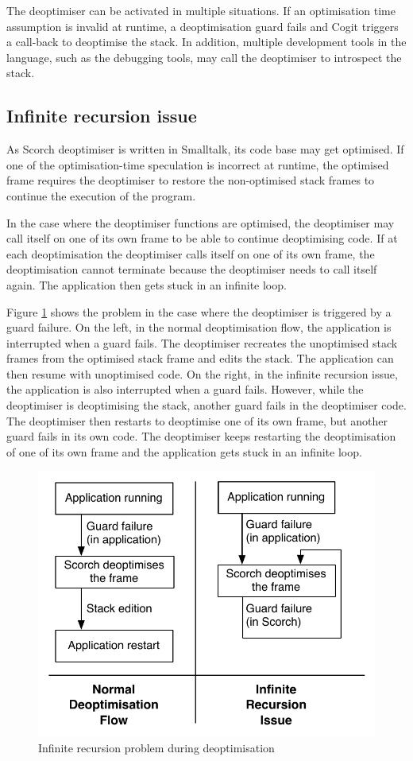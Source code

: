 \documentclass[a4paper,12pt,twoside]{../includes/ThesisStyle}
\begin{document}
The deoptimiser can be activated in multiple situations. If an optimisation time assumption is invalid at runtime, a deoptimisation guard fails and Cogit triggers a call-back to deoptimise the stack. In addition, multiple development tools in the language, such as the debugging tools, may call the deoptimiser to introspect the stack.

\subsection{Infinite recursion issue}

As Scorch deoptimiser is written in Smalltalk, its code base may get optimised. If one of the optimisation-time speculation is incorrect at runtime, the optimised frame requires the deoptimiser to restore the non-optimised stack frames to continue the execution of the program. 

In the case where the deoptimiser functions are optimised, the deoptimiser may call itself on one of its own frame to be able to continue deoptimising code. If at each deoptimisation the deoptimiser calls itself on one of its own frame, the deoptimisation cannot terminate because the deoptimiser needs to call itself again. The application then gets stuck in an infinite loop.

Figure \ref{fig:InfiniteRecursionDeoptPb} shows the problem in the case where the deoptimiser is triggered by a guard failure. On the left, in the normal deoptimisation flow, the application is interrupted when a guard fails. The deoptimiser recreates the unoptimised stack frames from the optimised stack frame and edits the stack. The application can then resume with unoptimised code. On the right, in the infinite recursion issue, the application is also interrupted when a guard fails. However, while the deoptimiser is deoptimising the stack, another guard fails in the deoptimiser code. The deoptimiser then restarts to deoptimise one of its own frame, but another guard fails in its own code. The deoptimiser keeps restarting the deoptimisation of one of its own frame and the application gets stuck in an infinite loop.

\begin{figure}[h!]
    \begin{center}
        \includegraphics[width=0.65\linewidth]{InfiniteRecursionDeoptPb}
        \caption{Infinite recursion problem during deoptimisation}
        \label{fig:InfiniteRecursionDeoptPb}
    \end{center}
\end{figure}
\end{document}
